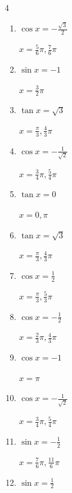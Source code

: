 \begin{multicols}{4}
\begin{enumerate}
        $\displaystyle x = 0 , \pi$

  \item $\displaystyle \cos{x}  = -\frac{\sqrt{3}}{2}$

        $\displaystyle x = \frac{5}{6}\pi , \frac{7}{6}\pi$

  \item $\displaystyle \sin{x}  = -1$

        $\displaystyle x = \frac{3}{2}\pi$

  \item $\displaystyle \tan{x}  = \sqrt{3}$

        $\displaystyle x = \frac{\pi}{3} , \frac{4}{3}\pi$

  \item $\displaystyle \cos{x}  = -\frac{1}{\sqrt{2}}$

        $\displaystyle x = \frac{3}{4}\pi , \frac{5}{4}\pi$

  \item $\displaystyle \tan{x}  = 0$

        $\displaystyle x = 0 , \pi$

  \item $\displaystyle \tan{x}  = \sqrt{3}$

        $\displaystyle x = \frac{\pi}{3} , \frac{4}{3}\pi$

  \item $\displaystyle \cos{x}  = \frac{1}{2}$

        $\displaystyle x = \frac{\pi}{3} , \frac{5}{3}\pi$

  \item $\displaystyle \cos{x}  = -\frac{1}{2}$

        $\displaystyle x = \frac{2}{3}\pi , \frac{4}{3}\pi$

  \item $\displaystyle \cos{x}  = -1$

        $\displaystyle x = \pi$

  \item $\displaystyle \cos{x}  = -\frac{1}{\sqrt{2}}$

        $\displaystyle x = \frac{3}{4}\pi , \frac{5}{4}\pi$

\columnbreak %

  \item $\displaystyle \sin{x}  = -\frac{1}{2}$

        $\displaystyle x = \frac{7}{6}\pi , \frac{11}{6}\pi$

  \item $\displaystyle \sin{x}  = \frac{1}{2}$


\end{enumerate}
\end{multicols}
